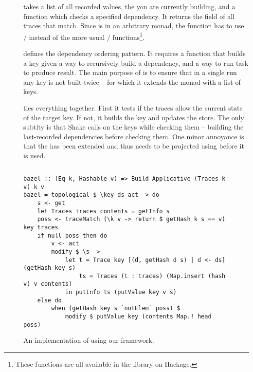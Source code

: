 \begin{description}
\item[] takes a list of all recorded  values, the  you are currently building, and a function  which checks a specified dependency. It returns the  field of all traces that match. Since  is in an arbitrary monad, the function has to use /\hs{&&^} instead of the more usual /\hs{&&} functions\footnote{These functions are all available in the  library on Hackage.}.
\item[] defines the dependency ordering pattern. It requires a  function that builds a key given a way to recursively build a dependency, and a way to run task to produce result. The main purpose of  is to ensure that in a single run any key is not built twice -- for which it extends the  monad with a list of  keys.
\item[] ties everything together. First it tests if the traces allow the current state of the target key. If not, it builds the key and updates the store. The only subtlty is that Shake calls  on the keys while checking them -- building the last-recorded dependencies before checking them. One minor annoyance is that the  has been extended and thus needs to be projected using  before it is used.
\end{description}

\subsection{\Bazel}\label{sec-implementation-bazel}

\begin{figure}
\begin{verbatim}
bazel :: (Eq k, Hashable v) => Build Applicative (Traces k v) k v
bazel = topological $ \key ds act -> do
    s <- get
    let Traces traces contents = getInfo s
    poss <- traceMatch (\k v -> return $ getHash k s == v) key traces
    if null poss then do
        v <- act
        modify $ \s ->
            let t = Trace key [(d, getHash d s) | d <- ds] (getHash key s)
                ts = Traces (t : traces) (Map.insert (hash v) v contents)
            in putInfo ts (putValue key v s)
    else do
        when (getHash key s `notElem` poss) $
            modify $ putValue key (contents Map.! head poss)
\end{verbatim}
\vspace{-2mm}
\caption{An implementation of \Bazel using our framework.}\label{fig-bazel-implementation}
\vspace{-2mm}
\end{figure}


